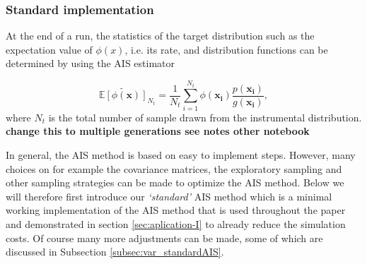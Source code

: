 \documentclass[a4paper,fleqn,usenatbib]{mnras}
\begin{document}
%	




\subsubsection{Standard implementation}

At the end of a run, the statistics of the target distribution such as the expectation value of $\phi(x)$, i.e. its rate,  and  distribution functions can be determined by using the AIS estimator

\begin{equation}
	\widetilde{\mathbb{E}[\phi(\mathbf{x})]}_{N_t} = \frac{1}{N_t} \sum_{i=1}^{N_t} \phi(\mathbf{x_i}) \frac{p(\mathbf{x_i})}{g(\mathbf{x_i})}, 
	\label{eq:ISestimator}
\end{equation}
where $N_t$ is the total number of sample drawn from the instrumental distribution. \textbf{change this to multiple generations see notes other notebook}

In general, the AIS method is based on easy to implement steps. However, many choices on for example the covariance matrices, the exploratory sampling and other sampling strategies can be made to optimize the AIS method. Below we will therefore first introduce our \emph{`standard'} AIS method which is a minimal working implementation of the AIS method that is used throughout the paper and demonstrated in section \ref{sec:aplication-I} to already reduce the simulation costs. Of course many more adjustments can be made, some of which are discussed in Subsection \ref{subsec:var_standardAIS}.     
\end{document}
